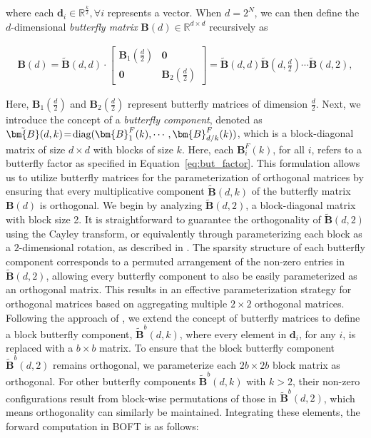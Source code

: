 where each $\bm{d}_i\in\mathbb{R}^{\frac{k}{2}}, \forall i$ represents a vector. When $d=2^N$, we can then define the $d$-dimensional \emph{butterfly matrix} $\bm{B}(d)\in\mathbb{R}^{d\times d}$ recursively as

\begin{equation}
\begin{aligned}
    \!\!\bm{B}(d)=\tilde{\bm{B}}(d,d)\!\cdot\!\begin{bmatrix}
    \bm{B}_1(\frac{d}{2})\!\!\!\!\! & \bm{0} \\
    \bm{0}\!\!\!\!\! &\bm{B}_2(\frac{d}{2})
    \end{bmatrix}= \tilde{\bm{B}}(d,d)\tilde{\bm{B}}(d,\frac{d}{2})\cdots\tilde{\bm{B}}(d,2),
\end{aligned}
\end{equation}

Here, $\bm{B}_1(\frac{d}{2})$ and $\bm{B}_2(\frac{d}{2})$ represent butterfly matrices of dimension $\frac{d}{2}$. Next, we introduce the concept of a \emph{butterfly component}, denoted as $\thickmuskip=2mu \medmuskip=2mu \tilde{\bm{B}}(d,k)=\text{diag}(\bm{B}^F_1(k),\cdots,\bm{B}^F_{d/k}(k))$, which is a block-diagonal matrix of size $d \times d$ with blocks of size $k$. Here, each $\bm{B}^F_i(k)$, for all $i$, refers to a butterfly factor as specified in Equation~\ref{eq:but_factor}. This formulation allows us to utilize butterfly matrices for the parameterization of orthogonal matrices by ensuring that every multiplicative component $\tilde{\bm{B}}(d,k)$ of the butterfly matrix $\bm{B}(d)$ is orthogonal. We begin by analyzing $\tilde{\bm{B}}(d,2)$, a block-diagonal matrix with block size 2. It is straightforward to guarantee the orthogonality of $\tilde{\bm{B}}(d,2)$ using the Cayley transform, or equivalently through parameterizing each block as a $2$-dimensional rotation, as described in \cite{liu2021orthogonal,qiu2023controlling}. The sparsity structure of each butterfly component corresponds to a permuted arrangement of the non-zero entries in $\tilde{\bm{B}}(d,2)$, allowing every butterfly component to also be easily parameterized as an orthogonal matrix. This results in an effective parameterization strategy for orthogonal matrices based on aggregating multiple $2 \times 2$ orthogonal matrices. Following the approach of \cite{chen2022pixelated}, we extend the concept of butterfly matrices to define a block butterfly component, $\tilde{\bm{B}}^b(d,k)$, where every element in $\bm{d}_i$, for any $i$, is replaced with a $b \times b$ matrix. To ensure that the block butterfly component $\tilde{\bm{B}}^b(d,2)$ remains orthogonal, we parameterize each $2b \times 2b$ block matrix as orthogonal. For other butterfly components $\tilde{\bm{B}}^b(d,k)$ with $k>2$, their non-zero configurations result from block-wise permutations of those in $\tilde{\bm{B}}^b(d,2)$, which means orthogonality can similarly be maintained. Integrating these elements, the forward computation in BOFT is as follows:

